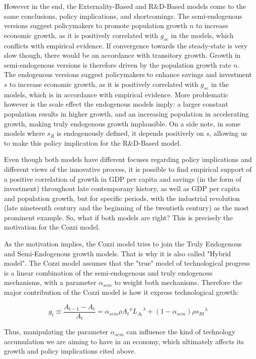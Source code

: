 \documentclass[11pt]{article} %
\begin{document}
\par However in the end, the Externality-Based and R\&D-Based models come to the same conclusions, policy implications, and shortcomings. The semi-endogenous versions suggest policymakers to promote population growth $n$ to increase economic growth, as it is positively correlated with $g_{se}$ in the models, which conflicts with empirical evidence. If convergence towards the steady-state is very slow though, there would be an accordance with transitory growth. Growth in semi-endogenous versions is therefore driven by the population growth rate $n$. The endogenous versions suggest policymakers to enhance savings and investment $s$ to increase economic growth, as it is positively correlated with $g_{se}$ in the models, which is in accordance with empirical evidence. More problematic however is the scale effect the endogenous models imply: a larger constant population results in higher growth, and an increasing population in accelerating growth, making truly endogenous growth implausible. On a side note, in some models where $s_R$ is endogenously defined, it depends positively on $s$, allowing us to make this policy implication for the R\&D-Based model.

\par Even though both models have different focuses regarding policy implications and different views of the innovative process, it is possible to find empirical support of a positive correlation of growth in GDP per capita and savings (in the form of investment) throughout late contemporany history, as well as GDP per capita and population growth, but for specific periods, with the industrial revolution (late nineteenth century and the beginning of the twentieth century) as the most prominent example. So, what if both models are right? This is precisely the motivation for the Cozzi model.

\par As the motivation implies, the Cozzi model tries to join the Truly Endogenous and Semi-Endogenous growth models. That is why it is also called "Hybrid model". The Cozzi model assumes that the "true" model of technological progress is a linear combination of the semi-endogenous and truly endogenous mechanisms, with a parameter $\alpha_{sem}$ to weight both mechanisms. Therefore the major contribution of the Cozzi model is how it express technological growth:

\begin{equation}
    g_t \equiv \frac{A_{t-1}-A_t}{A_t} = \alpha_{sem}\rho{A_t}^{\phi}{L_{A_{t}}}^{\lambda} + (1-\alpha_{sem})\rho{s_{Rt}}^{\lambda}
\end{equation}

\par Thus, manipulating the parameter $\alpha_{sem}$ can influence the kind of technology accumulation we are aiming to have in an economy, which ultimately affects its growth and policy implications cited above.
\end{document}
